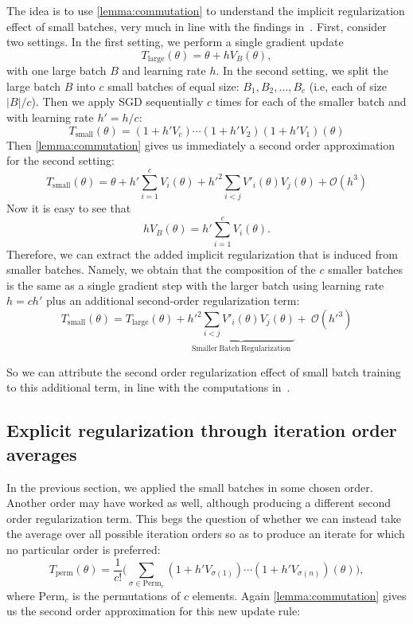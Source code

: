 \documentclass[10pt]{article} %
\theoremstyle{plain}
\theoremstyle{definition}
\theoremstyle{remark}
\begin{document}
The idea is to use \cref{lemma:commutation} to understand the implicit regularization effect of small batches, very much in line with the findings in~\citet{smith2021on}.
First, consider two settings. In the first setting, we perform a single gradient update 
\[
T_{\textrm{large}}(\theta) = \theta + h V_B(\theta),
\]
with one large batch $B$ and learning rate $h$. In the second setting, we split the large batch $B$ into $c$ small batches of equal size: $B_{1}, B_{2}, \ldots, B_{c}$ (i.e, each of size $|B|/c$). Then we apply SGD sequentially $c$ times for each of the smaller batch and with learning rate $h' = h / c$:
\[
T_{\textrm{small}}(\theta) = 
(1 + h'V_{c})\cdots (1 + h'V_{2})(1 + h'V_{1})(\theta)
\]
Then  \cref{lemma:commutation} gives us immediately a second order approximation for the second setting:
\[
T_{\textrm{small}}(\theta) =  \theta + h'\sum_{i=1}^c V_{i}(\theta) + {h'}^2\sum_{i < j} V'_{i}(\theta)V_{j}(\theta) + \mathcal O(h^3)
\]
Now it is easy to see that
\[
h V_B(\theta) = h'\sum_{i=1}^c V_i(\theta).
\]
Therefore, we can extract the added implicit regularization that is induced from smaller batches. Namely, we obtain that the composition of the $c$ smaller batches is the same as a single gradient step with the larger batch using learning rate $h = c h'$ plus an additional second-order regularization term:
\[
T_{\textrm{small}}(\theta) = T_{\textrm{large}}(\theta) + \underbrace{{h'}^2\sum_{i < j} V'_{i}(\theta)V_{j}(\theta)}_{\mathrm{Smaller\ Batch\ Regularization}} +\ \mathcal O({h'}^3)
\]

So we can attribute the second order regularization effect of small batch training to this additional term, in line with the computations in~\cite{smith2021on}.

\subsection{Explicit regularization through iteration order averages}

In the previous section, we applied the small batches in some chosen order. Another order may have worked as well, although producing a different second order regularization term.
This begs the question of whether we can instead take the average over all possible iteration orders so as to produce an iterate for which no particular order is preferred:
\begin{equation}
    T_{\textrm{perm}}(\theta) = \frac 1{c!}\Big(
    \sum_{\sigma \in \mathrm{Perm}_c}
    (1 + h' V_{\sigma(1)})\cdots (1 +h' V_{\sigma(n)})(\theta)\Big),
\end{equation}
where $\mathrm{Perm}_c$ is the permutations of $c$ elements.
Again \cref{lemma:commutation} gives us the second order approximation for this new update rule:
\end{document}
